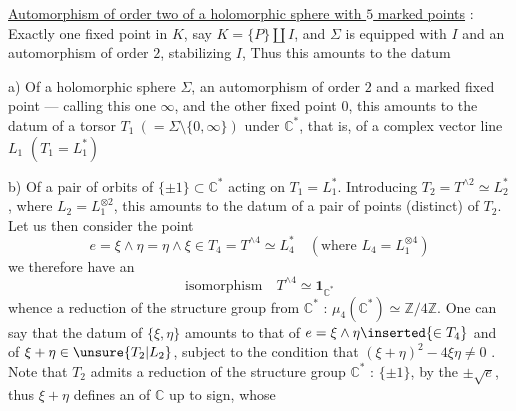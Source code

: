 \uline{Automorphism of order two of a holomorphic sphere \inserted{$\Sigma$} with
 $5$ marked points} : Exactly one fixed point in $K$,
say $K=\{P\}\amalg I$, and $\Sigma$ is equipped with $I$ and an automorphism
\inserted{$\sigma$} of order $2$, stabilizing $I$,
Thus this amounts to the datum

a) Of a holomorphic sphere $\Sigma$, an automorphism \inserted{$\sigma$} of order $2$
and a marked fixed point --- calling this one $\infty$, and the other fixed point $0$,
this amounts to the datum of a torsor $T_1\ (= \Sigma\setminus\{0,\infty\})$
under $\mathbb C^*$, that is, of a complex vector line $L_1$
$(T_1=L_1^*)$

b) Of a pair of  orbits of
$\{\pm1\}\subset\mathbb C^*$ acting on $T_1=L_1^*$.
Introducing $T_2=T^{\wedge2}\simeq L_2^*$, where
$L_2=L_1^{\otimes2}$, this amounts to the datum of a pair of points
\inserted{$\{\xi,\eta\}$} (distinct) of $T_2$.
Let us then consider the point
\[
 e=\xi\wedge\eta=\eta\wedge\xi
 \in T_4=T^{\wedge4}\simeq L_4^*
 \quad(\text{where }L_4=L_1^{\otimes4})
\]
we therefore have an
\[
 \mathrm{isomorphism}\quad T^{\wedge4}\simeq\mathbf1_{\mathbb C^*}
\]
whence a reduction of the structure group 
from $\mathbb C^*$ : $\mu_4(\mathbb C^*)\simeq\mathbb Z/4\mathbb Z$.
One can say that the datum of $\{\xi,\eta\}$ amounts to that of
$e=\xi\wedge\eta\inserted{\in T_4}$ and of
$\xi+\eta\in\unsure{T_2|L_2}$, subject to the condition that
$(\xi+\eta)^2-4\xi\eta\ne0$ .
Note 
that $T_2$ admits a reduction of the structure group $\mathbb C^*$ :
$\{\pm1\}$, by the  $\pm\sqrt e$, thus $\xi+\eta$
defines an  of $\mathbb C$ up to sign, whose
  


  




  

 


 




